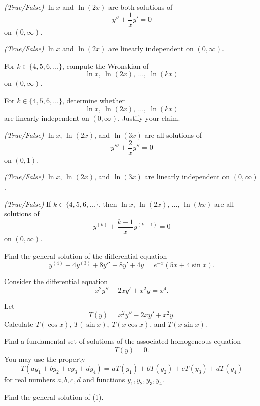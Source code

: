 \begin{problem}
\begin{problemsubparts}
\item \textit{(True/False)} $\ln x$ and $\ln(2x)$ are both solutions of
\[
y''+\frac1x y'=0
\]
on $(0,\infty)$.
\item \textit{(True/False)} $\ln x$ and $\ln(2x)$ are linearly independent on $(0,\infty)$.
\item For $k\in\{4,5,6,\dots\}$, compute the Wronskian of
\[
\ln x,\ \ln(2x),\ \dots,\ \ln(kx)
\]
on $(0,\infty)$.
\item For $k\in\{4,5,6,\dots\}$, determine whether
\[
\ln x,\ \ln(2x),\ \dots,\ \ln(kx)
\]
are linearly independent on $(0,\infty)$. Justify your claim.
\item \textit{(True/False)} $\ln x$, $\ln(2x)$, and $\ln(3x)$ are all solutions of
\[
y'''+\frac2x y''=0
\]
on $(0,1)$.
\item \textit{(True/False)} $\ln x$, $\ln(2x)$, and $\ln(3x)$ are linearly independent on $(0,\infty)$.
\item \textit{(True/False)} If $k\in\{4,5,6,\dots\}$, then $\ln x$, $\ln(2x)$, $\dots$, $\ln(kx)$ are all solutions of
\[
y^{(k)}+\frac{k-1}{x}y^{(k-1)}=0
\]
on $(0,\infty)$.
\end{problemsubparts}
\end{problem}

\begin{problem}
Find the general solution of the differential equation
\[
y^{(4)}-4y^{(3)}+8y''-8y'+4y=e^{-x}(5x+4\sin x).
\]
\end{problem}

\begin{problem}
Consider the differential equation
\[
x^2y''-2xy'+x^2y=x^4. \tag{1}
\]
\begin{problemsubparts}
\item Let
\[
T(y)=x^2y''-2xy'+x^2y.
\]
Calculate $T(\cos x)$, $T(\sin x)$, $T(x\cos x)$, and $T(x\sin x)$.
\item Find a fundamental set of solutions of the associated homogeneous equation
\[
T(y)=0.
\]
You may use the property
\[
T(ay_1+by_2+cy_3+dy_4)
=aT(y_1)+bT(y_2)+cT(y_3)+dT(y_4)
\]
for real numbers $a,b,c,d$ and functions $y_1,y_2,y_3,y_4$.
\item Find the general solution of (1).
\end{problemsubparts}
\end{problem}

